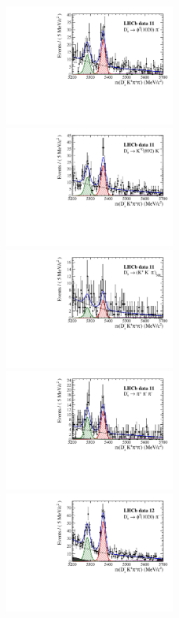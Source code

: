 \begin{figure}[h]
\includegraphics[height=!,width=0.5\textwidth]{figs/MassFit/signal_y11_phipi.pdf}
\includegraphics[height=!,width=0.5\textwidth]{figs/MassFit/signal_y11_KsK.pdf}
\includegraphics[height=!,width=0.5\textwidth]{figs/MassFit/signal_y11_KKpi_NR.pdf}
\includegraphics[height=!,width=0.5\textwidth]{figs/MassFit/signal_y11_pipipi.pdf}
\includegraphics[height=!,width=0.5\textwidth]{figs/MassFit/signal_y12_phipi.pdf}

\end{figure}
